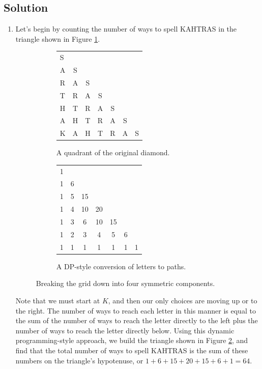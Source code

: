 \documentclass{article}
\begin{document}
\subsection*{Solution}
    \begin{enumerate}
        \item Let's begin by counting the number of ways to spell KAHTRAS in the triangle shown in Figure \ref*{fig:E2Sa}.
        \begin{figure}[htbp]
            \centering
            \begin{subfigure}[t]{0.45\textwidth}
                \centering
                \begin{tabular}{lcccccc}
                    S \\
                    A & S \\
                    R & A & S \\
                    T & R & A & S \\
                    H & T & R & A & S \\
                    A & H & T & R & A & S \\
                    K & A & H & T & R & A & S
                \end{tabular}
                \caption{A quadrant of the original diamond.}
                \label{fig:E2Sa}
            \end{subfigure}
            \begin{subfigure}[t]{0.45\textwidth}
                \centering
                \begin{tabular}{lcccccc}
                    1 \\
                    1 & 6 \\
                    1 & 5 & 15 \\
                    1 & 4 & 10 & 20 \\
                    1 & 3 & 6 & 10 & 15 \\
                    1 & 2 & 3 & 4 & 5 & 6 \\
                    1 & 1 & 1 & 1 & 1 & 1 & 1
                \end{tabular}
                \caption{A DP-style conversion of letters to paths.}
                \label{fig:E2Sb}
            \end{subfigure}
            \caption{Breaking the grid down into four symmetric components.}
            \label{E2S}
        \end{figure}
        
        \qquad Note that we must start at $K$, and then our only choices are moving up or to the right. The number of ways to reach each letter in this manner is equal to the sum of the number of ways to reach the letter directly to the left plus the number of ways to reach the letter directly below. Using this dynamic programming-style approach, we build the triangle shown in Figure \ref*{fig:E2Sb}, and find that the total number of ways to spell KAHTRAS is the sum of these numbers on the triangle's hypotenuse, or $1 + 6 + 15 + 20 + 15 + 6 + 1 = 64$.
        

\end{enumerate}
\end{document}

